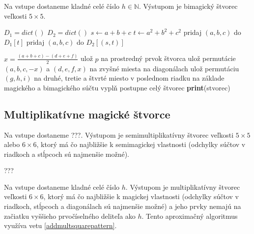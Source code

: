 \begin{subalg} Na vstupe dostaneme kladné celé číslo $h \in \mathbb{N}$. Výstupom je bimagický štvorec veľkosti $5 \times 5$.
\end{subalg}

\begin{algorithmic}
\STATE $D_1 = dict()$
\STATE $D_2 = dict()$
			\STATE $s \gets a+b+c$
			\STATE $t \gets a^2+b^2+c^2$
			\STATE pridaj $(a,b,c)$ do $D_1[t]$
			\STATE pridaj $(a,b,c)$ do $D_2[(s,t)]$
		\ENDFOR
	\ENDFOR
\ENDFOR

		\STATE $x = \frac{(a+b+c) - (d+e+f)}{2}$
						\STATE ulož $p$ na prostredný prvok štvorca
						\STATE ulož permutácie $(a,b,c,-x)$ a $(d,e,f,x)$ na zvyšné miesta na diagonálach
						\STATE ulož permutáciu $(g,h,i)$ na druhé, tretie a štvrté miesto v poslednom riadku
						\STATE na základe magického a bimagického súčtu vyplň postupne celý štvorec
							\STATE \textbf{print}(stvorec)
						\ENDIF
					\ENDFOR
				\ENDIF
			\ENDFOR
		\ENDFOR
	\ENDFOR
\ENDFOR
\end{algorithmic}

\subsection{Multiplikatívne magické štvorce} 

\begin{subalg} Na vstupe dostaneme ???. Výstupom je semimultiplikatívny štvorec veľkosti $5 \times 5$ alebo $6 \times 6$, ktorý má čo najbližšie k semimagickej vlastnosti (odchylky súčtov v riadkoch a stĺpcoch sú najmenšie možné).
\end{subalg}

\begin{subcode}
???
\end{subcode}

\begin{subalg} Na vstupe dostaneme kladné celé číslo $h$. Výstupom je multiplikatívny štvorec veľkosti $6 \times 6$, ktorý má čo najbližšie k magickej vlastnosti (odchylky súčtov v riadkoch, stĺpcoch a diagonálach sú najmenšie možné) a jeho prvky nemajú na začiatku vyššieho prvočíselného deliteľa ako $h$. Tento aproximačný algoritmus využíva vetu \ref{addmultsquarepattern}.
\end{subalg}


